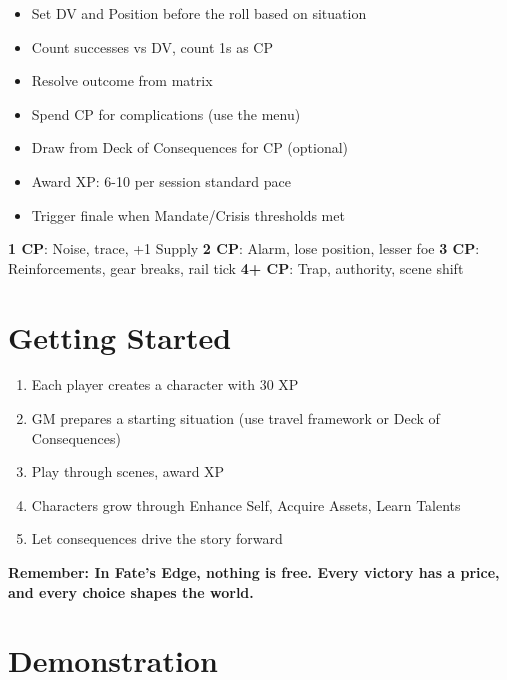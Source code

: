 \documentclass[11pt]{article}
\begin{document}
\begin{itemize}
    \item Set DV and Position before the roll based on situation
    \item Count successes vs DV, count 1s as CP
    \item Resolve outcome from matrix
    \item Spend CP for complications (use the menu)
    \item Draw from Deck of Consequences for CP (optional)
    \item Award XP: 6-10 per session standard pace
    \item Trigger finale when Mandate/Crisis thresholds met
\end{itemize}

\begin{fatebox}
\textbf{1 CP}: Noise, trace, +1 Supply
\textbf{2 CP}: Alarm, lose position, lesser foe
\textbf{3 CP}: Reinforcements, gear breaks, rail tick  
\textbf{4+ CP}: Trap, authority, scene shift
\end{fatebox}

\section{Getting Started}

\begin{enumerate}
    \item Each player creates a character with 30 XP
    \item GM prepares a starting situation (use travel framework or Deck of Consequences)
    \item Play through scenes, award XP
    \item Characters grow through Enhance Self, Acquire Assets, Learn Talents
    \item Let consequences drive the story forward
\end{enumerate}

\begin{center}
\textbf{Remember: In Fate's Edge, nothing is free. Every victory has a price, and every choice shapes the world.}
\end{center}

\section{Demonstration}

\newcommand{\dice}[1]{\texttt{#1}}
\newcommand{\dv}[1]{\textbf{DV #1}}
\newcommand{\cp}[1]{\textbf{CP: #1}}
\end{document}
